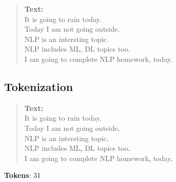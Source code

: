 \begin{quote}
\textbf{Text:} 					\\
It is going to rain today. 			\\
Today I am not going outside.			\\
NLP is an intersting topic. 			\\
NLP includes ML, DL topics too. 		\\
I am going to complete NLP homework, today. 	\\
\end{quote}
\subsection{Tokenization}
\begin{quote}
\textbf{Text:} 					\\
\color{red}It is going to rain today\textcolor{black}{.} 		\\
	Today I am not going outside\textcolor{black}{.}			\\
	NLP is an intersting topic\textcolor{black}{.} 			\\
	NLP includes ML\textcolor{black}{,} DL topics too\textcolor{black}{.} 		\\
	I am going to complete NLP homework\textcolor{black}{,} today\textcolor{black}{.} 	\\
\end{quote}
\textbf{Tokens}: 31
